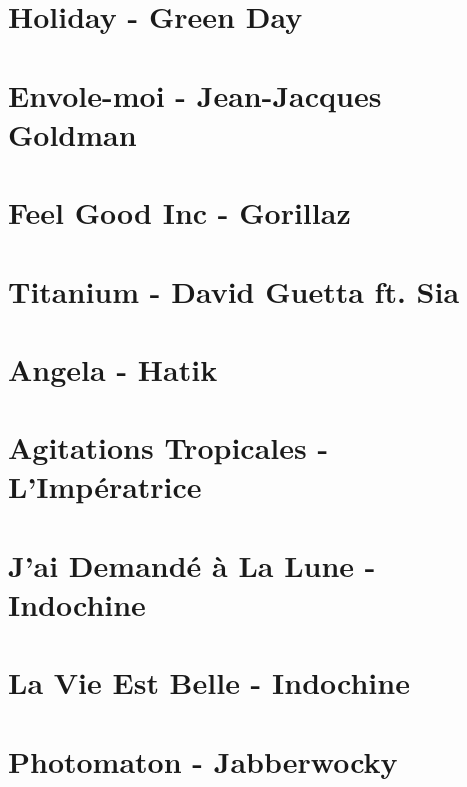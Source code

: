 \documentclass[11pt]{article}
\begin{document}
\section*{Holiday - Green Day}

\section{Envole-moi - Jean-Jacques Goldman}


\section{Feel Good Inc - Gorillaz}


\section{Titanium - David Guetta ft. Sia}
\begin{guitar}

\end{guitar}

\section{Angela - Hatik}
\begin{guitar}

\end{guitar}



\section{Agitations Tropicales - L'Impératrice}




\section*{J'ai Demandé à La Lune - Indochine}



\section{La Vie Est Belle - Indochine}
\begin{guitar}

\end{guitar}

\section{Photomaton - Jabberwocky}
\begin{guitar}

\end{guitar}
\end{document}
